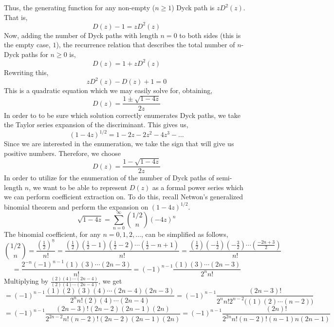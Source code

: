 \documentclass[12pt]{article}
\theoremstyle{definition}
\numberwithin{equation}{section}
\begin{document}
Thus, the generating function for any non-empty ($n\geq 1$) Dyck path is $zD^2(z)$. That is,
\begin{equation*}
    D(z) - 1 = zD^2(z)
\end{equation*}
Now, adding the number of Dyck paths with length $n=0$ to both sides (this is the empty case, $1$), the recurrence relation that describes the total number of $n$-Dyck paths for $n\geq 0$ is,
\begin{equation}
    D(z) = 1 + zD^2(z)
\end{equation}
Rewriting this,
\begin{equation}
    zD^2(z) - D(z) + 1 = 0
\end{equation}
This is a quadratic equation which we may easily solve for, obtaining,
\begin{equation}
    D(z) = \frac{1 \pm \sqrt{1 - 4z}}{2z}
\end{equation}
In order to to be sure which solution correctly enumerates Dyck paths, we take the Taylor series expansion of the discriminant. This gives us,
\begin{equation}
    (1 - 4z)^{1/2 } = 1 - 2z - 2z^2 - 4z^3 - \ldots
\end{equation}
Since we are interested in the enumeration, we take the sign that will give us positive numbers. Therefore, we choose
\begin{equation}
    D(z) =  \frac{1 - \sqrt{1 - 4z}}{2z} 
\end{equation}
In order to utilize for the enumeration of the number of Dyck paths of semi-length $n$, we want to be able to represent $D(z)$ as a formal power series which we can perform coefficient extraction on. To do this, recall Netwon's generalized binomial theorem and perform the expansion on $(1 - 4z)^{1/2}$. 
\begin{equation}
    \sqrt{1-4z} =  \sum_{n = 0}^\infty \binom{1/2}{n} (-4z)^n 
\end{equation}
The binomial coefficient, for any $n=0,1,2,\ldots$, can be simplified as follows,
$$\binom{1/2}{n} =\frac{(\frac{1}{2})^{\underline{n}}}{n!} =   \frac{(\frac{1}{2})(\frac{1}{2} - 1)(\frac{1}{2} - 2)\cdots (\frac{1}{2} - n + 1)}{n!} = 
\frac{(\frac{1}{2})(-\frac{1}{2})(-\frac{3}{2})\cdots (\frac{-2n+3}{2})}{n!}   $$
\begin{equation} = \frac{2^{-n} (-1)^{n-1} (1)(3)\cdots(2n - 3) }{n!} =
 (-1)^{n-1}\frac{ (1)(3)\cdots (2n-3)  }{2^n n!} \end{equation}
 Multiplying by $\frac{(2)(4)\cdots (2n-4)}{(2)(4)\cdots (2n-4)}$, we get
$$ = (-1)^{n-1} \frac{(1)(2)(3)(4)\cdots (2n-4)(2n-3)}{2^{n} n!  (2)(4)\cdots (2n-4)}  = (-1)^{n-1}\frac{(2n-3)!}{2^{n}n! 2^{n-2}\big((1)(2)\cdots (n-2)\big)}$$ 
$$ = (-1)^{n-1}\frac{(2n-3)!(2n-2)(2n-1)(2n)}{2^{2n-2}n!(n-2)!(2n-2)(2n-1)(2n)}  = (-1)^{n-1}\frac{(2n)!}{2^{2n}n!(n-2)!(n-1)n(2n-1)}$$
\end{document}
